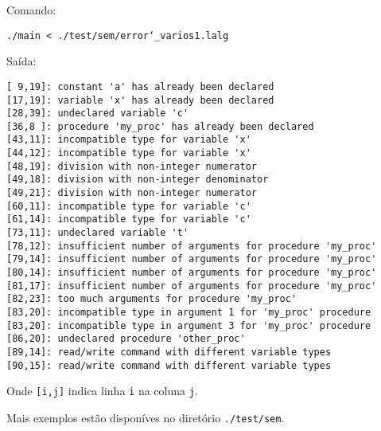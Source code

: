 \newpage
Comando:

	\indent\indent\texttt{./main < ./test/sem/error\char`_varios1.lalg}

Saída:
\begin{verbatim}[ 9,19]: constant 'a' has already been declared
[17,19]: variable 'x' has already been declared
[28,39]: undeclared variable 'c'
[36,8 ]: procedure 'my_proc' has already been declared
[43,11]: incompatible type for variable 'x'
[44,12]: incompatible type for variable 'x'
[48,19]: division with non-integer numerator
[49,18]: division with non-integer denominator
[49,21]: division with non-integer numerator
[60,11]: incompatible type for variable 'c'
[61,14]: incompatible type for variable 'c'
[73,11]: undeclared variable 't'
[78,12]: insufficient number of arguments for procedure 'my_proc'
[79,14]: insufficient number of arguments for procedure 'my_proc'
[80,14]: insufficient number of arguments for procedure 'my_proc'
[81,17]: insufficient number of arguments for procedure 'my_proc'
[82,23]: too much arguments for procedure 'my_proc'
[83,20]: incompatible type in argument 1 for 'my_proc' procedure
[83,20]: incompatible type in argument 3 for 'my_proc' procedure
[86,20]: undeclared procedure 'other_proc'
[89,14]: read/write command with different variable types
[90,15]: read/write command with different variable types\end{verbatim}

Onde \texttt{[i,j]} indica linha \texttt{i} na coluna {\texttt{j}}.

Mais exemplos estão disponíves no diretório \texttt{./test/sem}.
